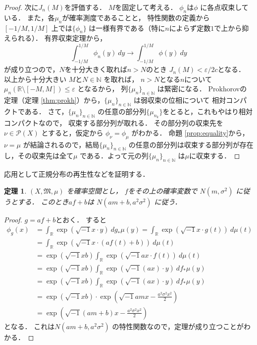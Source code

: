 \documentclass[leqno, 12pt]{jsarticle}
\newtheorem{thm}{定理}
\newcommand{\nn}{\mathbb{N}}
\newcommand{\rr}{\mathbb{R}}
\newcommand{\ep}{\varepsilon}
\begin{document}
\begin{proof}
次に$J_n(M)$を評価する．
$M$を固定して考える．
$\phi_n$は$\phi$
に各点収束している．
また，各$\mu_{n}$が確率測度であることと，
特性関数の定義から
$[-1/M, 1/M]$
上では$\{\phi_n\}$
は一様有界である（特に$n$によらず定数$1$で上から抑えられる）．
有界収束定理から，
\[
\int_{-1/M}^{1/M}\phi_{n}(y)\ dy\to \int_{-1/M}^{1/M}\phi(y)\ dy
\]
が成り立つので，$N$を十分大きく取れば$n>N$のとき
$J_n(M)<\ep/2c$となる．
以上から十分大きい
$M$と$N\in \nn$
を取れば，
$n>N$となる$n$について
$\mu_{n}(\rr\setminus [-M, M])\le\ep$
となるから，
列$\{\mu_n\}_{n\in \nn}$
は緊密になる．
Prokhorovの定理（定理 \ref{thm:prokh}）から，$\{\mu_n\}_{n\in \nn}$
は弱収束の位相について
相対コンパクトである．
さて，$\{\mu_n\}_{n\in \nn}$
の任意の部分列$\{\mu_{n_k}\}$をとると，これもやはり相対コンパクトなので，
収束する部分列が取れる．
その部分列の収束先を$\nu\in \mathcal{P}(X)$
とすると，仮定から
$\phi_{\nu}=\phi_{\mu}$
がわかる．
命題 \ref{prop:equality}から，$\nu=\mu$
が結論されるので，結局$\{\mu_n\}_{n\in \nn}$
の任意の部分列は収束する部分列が存在し，その収束先は全て$\mu$
である．よって元の列$\{\mu_n\}_{n\in \nn}$
は$\mu$に収束する．
\end{proof}

応用として正規分布の再生性などを証明する．
\begin{thm}
$(X, \mathfrak{M}, \mu)$
を確率空間とし，
$f$をその上の確率変数で
$N(m, \sigma^2)$
に従うとする．
このとき$af+b$は
$N(am+b, a^{2}\sigma^{2})$
に従う．
\end{thm}
\begin{proof}
$g=af+b$とおく．
すると
\begin{align*}
\phi_{g}(x)
&=
\int_{\rr}
	\exp(\sqrt{-1}x\cdot y)\ 
	dg_{*}\mu (y)
	=
	\int_{\rr}
	\exp(\sqrt{-1}x\cdot g(t))\ 
	d\mu (t)\\
	&=
	\int_{\rr}
	\exp(\sqrt{-1}x\cdot (af(t)+b))\ 
	d\mu (t)\\
	&=
	\exp(\sqrt{-1}xb)
	\int_{\rr}
	\exp(\sqrt{-1}ax\cdot f(t))\ 
	d\mu (t)\\
	&=
	\exp(\sqrt{-1}xb)
	\int_{\rr}
	\exp(\sqrt{-1}(ax)\cdot y)\ 
	df_{* }\mu (y)\\
	&=
	\exp(\sqrt{-1}xb)
	\int_{\rr}
	\exp(\sqrt{-1}(ax)\cdot y)\ 
	df_{* }\mu (y)\\
	&=
		\exp(\sqrt{-1}xb)\cdot
	\exp\left(\sqrt{-1}amx-\frac{a^2\sigma^2x^2}{2}\right)\\
	&=
	\exp\left(\sqrt{-1}(am+b)x-\frac{a^2\sigma^2x^2}{2}\right)
\end{align*}
となる．
これは$N(am+b, a^{2}\sigma^{2})$
の特性関数なので，定理が成り立つことがわかる．
\end{proof}
\end{document}
